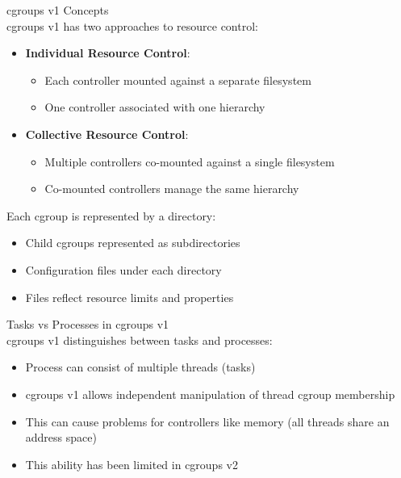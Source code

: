 \begin{definition}{cgroups v1 Concepts}\\
    cgroups v1 has two approaches to resource control:
    \begin{itemize}
        \item \textbf{Individual Resource Control}:
            \begin{itemize}
                \item Each controller mounted against a separate filesystem
                \item One controller associated with one hierarchy
            \end{itemize}
        \item \textbf{Collective Resource Control}:
            \begin{itemize}
                \item Multiple controllers co-mounted against a single filesystem
                \item Co-mounted controllers manage the same hierarchy
            \end{itemize}
    \end{itemize}
    
    Each cgroup is represented by a directory:
    \begin{itemize}
        \item Child cgroups represented as subdirectories
        \item Configuration files under each directory
        \item Files reflect resource limits and properties
    \end{itemize}
\end{definition}

\begin{definition}{Tasks vs Processes in cgroups v1}\\
    cgroups v1 distinguishes between tasks and processes:
    \begin{itemize}
        \item Process can consist of multiple threads (tasks)
        \item cgroups v1 allows independent manipulation of thread cgroup membership
        \item This can cause problems for controllers like memory (all threads share an address space)
        \item This ability has been limited in cgroups v2
    \end{itemize}
\end{definition}

